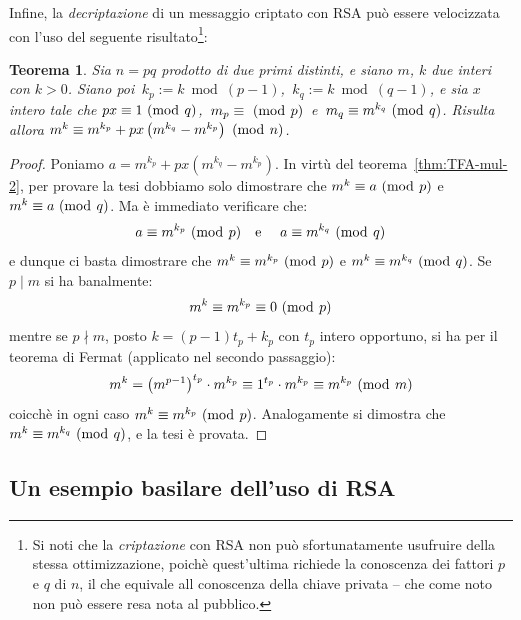 \documentclass[pdflatex,11pt,a4paper,oneside]{article}
\let\OldEmph\emph
\renewcommand{\emph}[1]{\OldEmph{#1\/}}
\newcommand{\p}[1]{\left({#1}\right)}
\newcommand{\divides}[0]{\mid}
\newcommand{\notdivides}[0]{\nmid}
\newcommand{\congruent}[0]{\equiv}
\newcommand{\mmodop}[0]{\ensuremath{\operatorname{mod}}}
\newcommand{\mmod}[1]{\ensuremath{\allowbreak\ (\mmodop\:{#1})}}
\newcommand{\rem}[2]{\ensuremath{{#1}\:\mmodop\:{#2}}}
\newtheorem{theorem}[TheoremLike]{Teorema}
\begin{document}
\medskip\noindent
Infine, la \emph{decriptazione} di un messaggio criptato con RSA pu\`o
essere velocizzata con l'uso del seguente risultato\footnote{Si noti che
la \emph{criptazione} con RSA non pu\`o sfortunatamente usufruire della
stessa ottimizzazione, poich\`e quest'ultima richiede la conoscenza dei
fattori $p$ e $q$ di $n$, il che equivale all conoscenza della chiave
privata -- che come noto non pu\`o essere resa nota al pubblico.}:
%
\begin{theorem}\label{thm:modular-exponentation-rsa-optimization}
Sia $n = pq$ prodotto di due primi distinti, e siano $m$, $k$ due
interi con $k > 0$.  Siano poi \,$k_p := \rem{k}{(p-1)}$,
\,$k_q := \rem{k}{(q-1)}$, e sia $x$ intero tale che
$px \congruent 1 \mmod q$, \,$m_p \congruent  \mmod p$\,
e \,$m_q \congruent m^{k_q} \mmod q$. Risulta allora
$m^k \congruent m^{k_p} + px\p{m^{k_q} - m^{k_p}}\mmod n$.
\end{theorem}
%
\begin{proof}
Poniamo $a = m^{k_p} + px\p{m^{k_q} - m^{k_p}}$.  In virt\`u del
teorema~\eqref{thm:TFA-mul-2}, per provare la tesi dobbiamo solo
dimostrare che $m^k \congruent a \mmod p$ e $m^k \congruent a \mmod q$.
Ma \`e immediato verificare che:
\begin{displaymath}
  a \congruent m^{k_p} \mmod p
    \text{\quad e \quad}
  a \congruent m^{k_q} \mmod q
\end{displaymath}
e dunque ci basta dimostrare che $m^k \congruent m^{k_p} \mmod p$ e
$m^k \congruent m^{k_q} \mmod q$. Se $p \divides m$ si ha banalmente:
\begin{displaymath}
  m^k \congruent m^{k_p} \congruent 0 \mmod p
\end{displaymath}
mentre se $p \notdivides m$, posto $k = (p - 1)t_p + k_p$ con $t_p$ intero
opportuno, si ha per il teorema di Fermat (applicato nel secondo
passaggio):
\begin{displaymath}
  m^k = \p{m^{p-1}}^{t_p} \cdot m^{k_p} \congruent 1^{t_p} \cdot m^{k_p}
      \congruent m^{k_p} \mmod m
\end{displaymath}
coicch\`e in ogni caso $m^k \congruent m^{k_p} \mmod p$. Analogamente si
dimostra che $m^k \congruent m^{k_q} \mmod q$, e la tesi \`e provata.
\end{proof}

\subsection{Un esempio basilare dell'uso di RSA}
\end{document}
